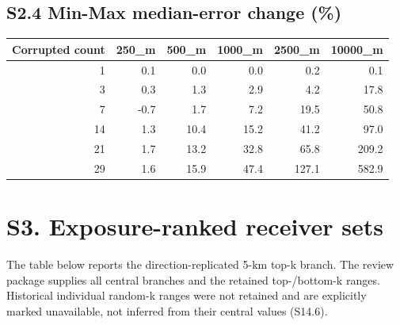 \documentclass[journal,onecolumn,10pt]{IEEEtran}
\begin{document}
\subsection*{S2.4 Min-Max median-error change (\%)}\label{s2.4-min-max-median-error-change}

\begin{center}\begin{minipage}{\textwidth}\centering
{}

\begin{tabular}{@{}rrrrrr@{}}
\toprule\noalign{}
Corrupted count & 250\_m & 500\_m & 1000\_m & 2500\_m & 10000\_m \\
\midrule\noalign{}

1 & 0.1 & 0.0 & 0.0 & 0.2 & 0.1 \\
3 & 0.3 & 1.3 & 2.9 & 4.2 & 17.8 \\
7 & -0.7 & 1.7 & 7.2 & 19.5 & 50.8 \\
14 & 1.3 & 10.4 & 15.2 & 41.2 & 97.0 \\
21 & 1.7 & 13.2 & 32.8 & 65.8 & 209.2 \\
29 & 1.6 & 15.9 & 47.4 & 127.1 & 582.9 \\
\bottomrule
\end{tabular}
\end{minipage}\end{center}

\section*{S3. Exposure-ranked receiver sets}\label{s3.-exposure-ranked-receiver-sets}

The table below reports the direction-replicated 5-km top-k branch. The review package supplies all central branches and the retained top-/bottom-k ranges. Historical individual random-k ranges were not retained and are explicitly marked unavailable, not inferred from their central values (S14.6).
\end{document}
